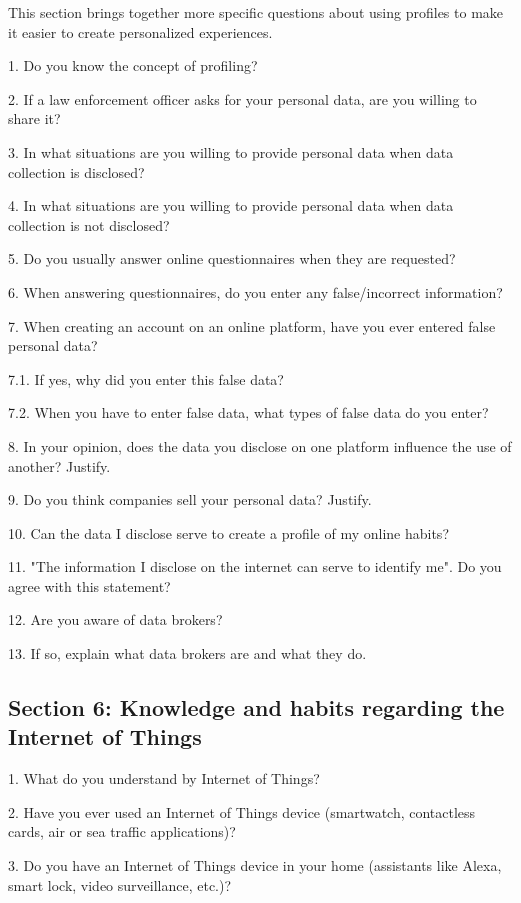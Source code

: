 This section brings together more specific questions about using profiles to make it easier to create personalized experiences.


1. Do you know the concept of profiling?

2. If a law enforcement officer asks for your personal data, are you willing to share it?

3. In what situations are you willing to provide personal data when data collection is disclosed?

4. In what situations are you willing to provide personal data when data collection is not disclosed?


5. Do you usually answer online questionnaires when they are requested?

6. When answering questionnaires, do you enter any false/incorrect information?

7. When creating an account on an online platform, have you ever entered false personal data?

7.1. If yes, why did you enter this false data?

7.2. When you have to enter false data, what types of false data do you enter?

8. In your opinion, does the data you disclose on one platform influence the use of another? Justify.

9. Do you think companies sell your personal data? Justify.

10. Can the data I disclose serve to create a profile of my online habits?

11. "The information I disclose on the internet can serve to identify me". Do you agree with this statement?

12. Are you aware of data brokers?

13. If so, explain what data brokers are and what they do.

\subsection*{Section 6: Knowledge and habits regarding the Internet of Things}


1. What do you understand by Internet of Things?

2. Have you ever used an Internet of Things device (smartwatch, contactless cards, air or sea traffic applications)?

3. Do you have an Internet of Things device in your home (assistants like Alexa, smart lock, video surveillance, etc.)?

